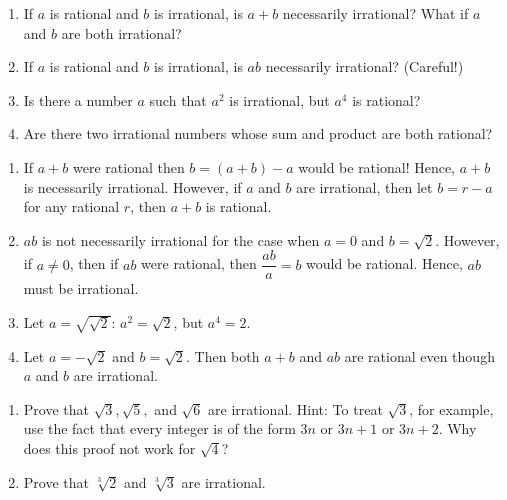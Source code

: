 \begin{pr} \label{2.12}%
  \begin{enumerate}[label=(\alph*)]
    \item If $a$ is rational and $b$ is irrational, is
    $a + b$ necessarily irrational? What if $a$ and $b$
    are both irrational?
    \item If $a$ is rational and $b$ is irrational,
    is $ab$ necessarily irrational? (Careful!)
    \item Is there a number $a$ such that $a^2$ is irrational,
    but $a^4$ is rational?
    \item Are there two irrational numbers whose sum and
    product are both rational?
  \end{enumerate}
\end{pr}

\begin{solution} %
  \begin{enumerate}[label=(\alph*)]
    \item If $a+b$ were rational then
    $b = (a+b) - a$ would be rational! Hence,
    $a+b$ is necessarily irrational. However,
    if $a$ and $b$ are irrational, then let $b = r - a$ for
    any rational $r$, then $a+b$ is rational.
    \item $ab$ is not necessarily irrational for the case
    when $a = 0$ and $b = \sqrt{2}$. However, if $a \neq 0$,
    then if $ab$ were rational, then $\dfrac{ab}{a} = b$
    would be rational. Hence, $ab$ must be irrational.
    \item Let $a = \sqrt{\sqrt{2}}$: $a^2 = \sqrt{2}$, but
    $a^4 = 2$.
    \item Let $a = -\sqrt{2}$ and $b = \sqrt{2}$. Then
    both $a+b$ and $ab$ are rational even though $a$
    and $b$ are irrational.
  \end{enumerate}
\end{solution}

\begin{pr} %
  \begin{enumerate}[label=(\alph*)]
    \item Prove that $\sqrt{3},\sqrt{5},$ and $\sqrt{6}$ are
    irrational. Hint: To treat $\sqrt{3}$, for example, use
    the fact that every integer is of the form $3n$ or
    $3n + 1$ or $3n + 2$. Why does this proof not work for
    $\sqrt{4}$?
    \item Prove that $\sqrt[3]{2}$ and $\sqrt[3]{3}$ are
    irrational.
  \end{enumerate}
\end{pr}

